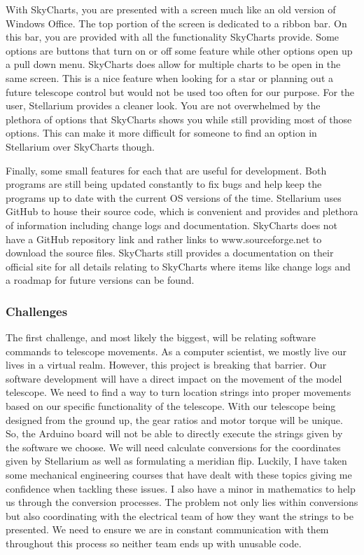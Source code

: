 \documentclass[12pt]{report}
\begin{document}
With SkyCharts, you are presented with a screen much like an old version of Windows Office. The top portion of the screen is dedicated to a ribbon bar. On this bar, you are provided with all the functionality SkyCharts provide. Some options are buttons that turn on or off some feature while other options open up a pull down menu. SkyCharts does allow for multiple charts to be open in the same screen. This is a nice feature when looking for a star or planning out a future telescope control but would not be used too often for our purpose. For the user, Stellarium provides a cleaner look. You are not overwhelmed by the plethora of options that SkyCharts shows you while still providing most of those options. This can make it more difficult for someone to find an option in Stellarium over SkyCharts though.

Finally, some small features for each that are useful for development. Both programs are still being updated constantly to fix bugs and help keep the programs up to date with the current OS versions of the time. Stellarium uses GitHub to house their source code, which is convenient and provides and plethora of information including change logs and documentation. SkyCharts does not have a GitHub repository link and rather links to www.sourceforge.net to download the source files. SkyCharts still provides a documentation on their official site for all details relating to SkyCharts where items like change logs and a roadmap for future versions can be found.

\subsubsection*{Challenges}

The first challenge, and most likely the biggest, will be relating software commands to telescope movements. As a computer scientist, we mostly live our lives in a virtual realm. However, this project is breaking that barrier. Our software development will have a direct impact on the movement of the model telescope. We need to find a way to turn location strings into proper movements based on our specific functionality of the telescope. With our telescope being designed from the ground up, the gear ratios and motor torque will be unique. So, the Arduino board will not be able to directly execute the strings given by the software we choose. We will need calculate conversions for the coordinates given by Stellarium as well as formulating a meridian flip. Luckily, I have taken some mechanical engineering courses that have dealt with these topics giving me confidence when tackling these issues. I also have a minor in mathematics to help us through the conversion processes. The problem not only lies within conversions but also coordinating with the electrical team of how they want the strings to be presented. We need to ensure we are in constant communication with them throughout this process so neither team ends up with unusable code.
\end{document}
